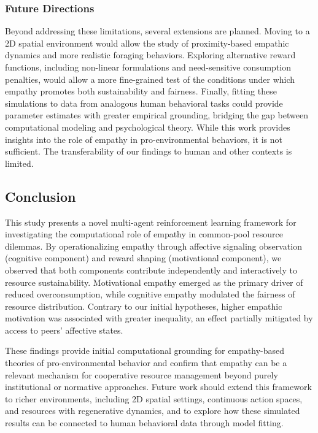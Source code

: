 \subsubsection{Future Directions}
Beyond addressing these limitations, several extensions are planned. Moving to a 2D spatial environment would allow the study of proximity-based empathic dynamics and more realistic foraging behaviors. Exploring alternative reward functions, including non-linear formulations and need-sensitive consumption penalties, would allow a more fine-grained test of the conditions under which empathy promotes both sustainability and fairness. Finally, fitting these simulations to data from analogous human behavioral tasks could provide parameter estimates with greater empirical grounding, bridging the gap between computational modeling and psychological theory.
While this work provides insights into the role of empathy in pro-environmental behaviors, it is not sufficient. The transferability of our findings to human and other contexts is limited.

\subsection{Conclusion}
This study presents a novel multi-agent reinforcement learning framework for investigating the computational role of empathy in common-pool resource dilemmas. By operationalizing empathy through affective signaling observation (cognitive component) and reward shaping (motivational component), we observed that both components contribute independently and interactively to resource sustainability. Motivational empathy emerged as the primary driver of reduced overconsumption, while cognitive empathy modulated the fairness of resource distribution. Contrary to our initial hypotheses, higher empathic motivation was associated with greater inequality, an effect partially mitigated by access to peers' affective states.

These findings provide initial computational grounding for empathy-based theories of pro-environmental behavior and confirm that empathy can be a relevant mechanism for cooperative resource management beyond purely institutional or normative approaches. Future work should extend this framework to richer environments, including 2D spatial settings, continuous action spaces, and resources with regenerative dynamics, and to explore how these simulated results can be connected to human behavioral data through model fitting.
